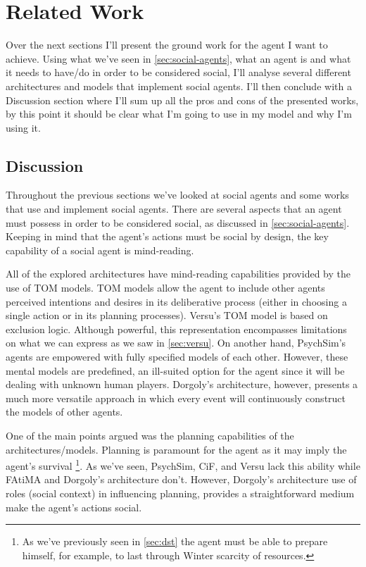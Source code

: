 \section{Related Work}
Over the next sections I'll present the ground work for the agent I want to achieve.
Using what we've seen in \ref{sec:social-agents}, what an agent is and what it needs to have/do in order to be considered social, I'll analyse several different architectures and models that implement social agents.
I'll then conclude with a Discussion section where I'll sum up all the pros and cons of the presented works, by this point it should be clear what I'm going to use in my model and why I'm using it.






%

\subsection{Discussion}
Throughout the previous sections we've looked at social agents and some works that use and implement social agents.
There are several aspects that an agent must possess in order to be considered social, as discussed in \ref{sec:social-agents}.
Keeping in mind that the agent's actions must be social by design, the key capability of a social agent is mind-reading.

All of the explored architectures have mind-reading capabilities provided by the use of \ac{TOM} models.
\ac{TOM} models allow the agent to include other agents perceived intentions and desires in its deliberative process (either in choosing a single action or in its planning processes).
Versu's \ac{TOM} model is based on exclusion logic.
Although powerful, this representation encompasses limitations on what we can express as we saw in \ref{sec:versu}.
On another hand, PsychSim's agents are empowered with fully specified models of each other.
However, these mental models are predefined, an ill-suited option for the agent since it will be dealing with unknown human players.
Dorgoly's architecture, however, presents a much more versatile approach in which every event will continuously construct the models of other agents.

One of the main points argued was the planning capabilities of the architectures/models.
Planning is paramount for the agent as it may imply the agent's survival \footnote{As we've previously seen in \ref{sec:dst} the agent must be able to prepare himself, for example, to last through Winter scarcity of resources. }.
As we've seen, PsychSim, \ac{CiF}, and Versu lack this ability while \ac{FAtiMA} and Dorgoly's architecture don't.
However, Dorgoly's architecture use of roles (social context) in influencing planning, provides a straightforward medium make the agent's actions social.

